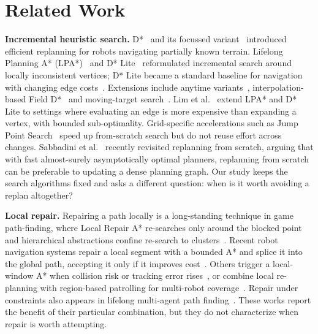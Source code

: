\documentclass[11pt,a4paper]{article}
\begin{document}
\section{Related Work}\label{sec:related}
\textbf{Incremental heuristic search.} D*~\cite{stentz1994} and its focussed variant~\cite{stentz1995} introduced efficient replanning for robots navigating partially known terrain. Lifelong Planning A* (LPA*)~\cite{koenig2004lpa} and D* Lite~\cite{koenig2002dstarlite,koenig2005fast} reformulated incremental search around locally inconsistent vertices; D* Lite became a standard baseline for navigation with changing edge costs~\cite{koenig2004incremental}. Extensions include anytime variants~\cite{likhachev2003ara,likhachev2005ad}, interpolation-based Field D*~\cite{ferguson2006field} and moving-target search~\cite{sun2010mtdstar}. Lim et al.~\cite{lim2024lazy} extend LPA* and D* Lite to settings where evaluating an edge is more expensive than expanding a vertex, with bounded sub-optimality. Grid-specific accelerations such as Jump Point Search~\cite{harabor2011jps} speed up from-scratch search but do not reuse effort across changes. Sabbadini et al.~\cite{sabbadini2026} recently revisited replanning from scratch, arguing that with fast almost-surely asymptotically optimal planners, replanning from scratch can be preferable to updating a dense planning graph. Our study keeps the search algorithms fixed and asks a different question: when is it worth avoiding a replan altogether?

\textbf{Local repair.} Repairing a path locally is a long-standing technique in game path-finding, where Local Repair A* re-searches only around the blocked point~\cite{silver2005} and hierarchical abstractions confine re-search to clusters~\cite{botea2004hpa}. Recent robot navigation systems repair a local segment with a bounded A* and splice it into the global path, accepting it only if it improves cost~\cite{stracca2026}. Others trigger a local-window A* when collision risk or tracking error rises~\cite{xu2026}, or combine local re-planning with region-based patrolling for multi-robot coverage~\cite{sharma2026}. Repair under constraints also appears in lifelong multi-agent path finding~\cite{luo2026}. These works report the benefit of their particular combination, but they do not characterize when repair is worth attempting.
\end{document}
